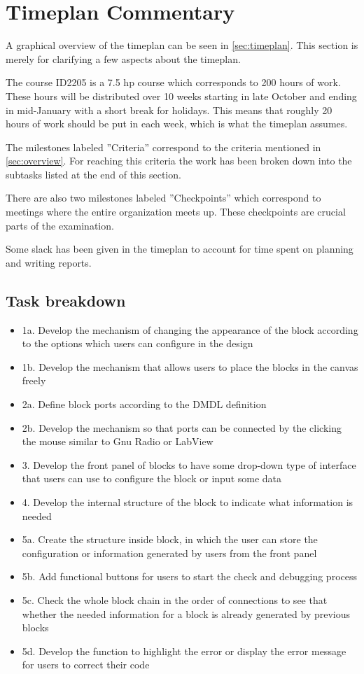 \documentclass[12pt,twoside]{article}
\begin{document}
\section{Timeplan Commentary}
\label{sec:commentary}
A graphical overview of the timeplan can be seen in \ref{sec:timeplan}. This section is merely for clarifying a few aspects
about the timeplan.

The course ID2205 is a 7.5 hp course which corresponds to 200 hours of work. These hours will be distributed
over 10 weeks starting in late October and ending in mid-January with a short break for holidays. This means
that roughly 20 hours of work should be put in each week, which is what the timeplan assumes.

The milestones labeled ''Criteria'' correspond to the criteria mentioned in \ref{sec:overview}. For reaching
this criteria the work has been broken down into the subtasks listed at the end of this section.

There are also two milestones labeled ''Checkpoints'' which correspond to meetings where the entire organization meets
up. These checkpoints are crucial parts of the examination.

Some slack has been given in the timeplan to account for time spent on planning and writing reports.

\subsection{Task breakdown}
\begin{itemize}
\item 1a. Develop the mechanism of changing the appearance of the block according to the options which users can configure in the design
\item 1b. Develop the mechanism that allows users to place the blocks in the canvas freely
\item 2a. Define block ports according to the DMDL definition
\item 2b. Develop the mechanism so that ports can be connected by the clicking the mouse similar to Gnu Radio or LabView
\item 3. Develop the front panel of blocks to have some drop-down type of interface that users can use to configure the block or input some data
\item 4. Develop the internal structure of the block to indicate what information is needed
\item 5a. Create the structure inside block, in which the user can store the configuration or information generated by users from the front panel
\item 5b. Add functional buttons for users to start the check and debugging process
\item 5c. Check the whole block chain in the order of connections to see that whether the needed information for a block is already generated by previous blocks
\item 5d. Develop the function to highlight the error or display the error message for users to correct their code
\end{itemize}
\end{document}
